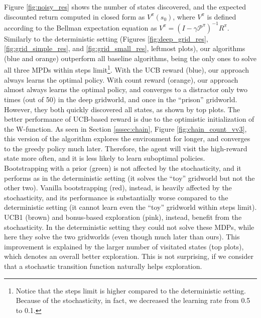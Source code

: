 \documentclass{article}
\newcommand{\reward}{R}
\providecommand{\prob}{\mathcal{P}}
\begin{document}
Figure \ref{fig:noisy_res} shows the number of states discovered, and the expected discounted return computed in closed form as $V^\pi(s_0)$, where $V^\pi$ is defined according to the Bellman expectation equation as $V^\pi = (I - \gamma \prob^\pi)^{-1}\reward^\pi$. Similarly to the deterministic setting (Figures \ref{fig:deep_grid_res}, \ref{fig:grid_simple_res}, and \ref{fig:grid_small_res}, leftmost plots), our algorithms (blue and orange) outperform all baseline algorithms, being the only ones to solve all three MPDs within steps limit\footnote{Notice that the steps limit is higher compared to the deterministic setting. Because of the stochasticity, in fact, we decreased the learning rate from 0.5 to 0.1.}. With the UCB reward (blue), our approach always learns the optimal policy. With count reward (orange), our approach almost always learns the optimal policy, and converges to a distractor only two times (out of 50) in the deep gridworld, and once in the ``prison'' gridworld. However, they both quickly discovered all states, as shown by top plots.
The better performance of UCB-based reward is due to the optimistic initialization of the W-function. As seen in Section \ref{sssec:chain}, Figure \ref{fig:chain_count_vv3}, this version of the algorithm explores the environment for longer, and converges to the greedy policy much later. Therefore, the agent will visit the high-reward state more often, and it is less likely to learn suboptimal policies.
\\Bootstrapping with a prior (green) is not affected by the stochasticity, and it performs as in the deterministic setting (it solves the ``toy'' gridworld but not the other two).
Vanilla bootstrapping (red), instead, is heavily affected by the stochasticity, and its performance is substantially worse compared to the deterministic setting (it cannot learn even the ``toy'' gridworld within steps limit). 
UCB1 (brown) and bonus-based exploration (pink), instead, benefit from the stochasticity. In the deterministic setting they could not solve these MDPs, while here they solve the two gridworlds (even though much later than ours). This improvement is explained by the larger number of visitated states (top plots), which denotes an overall better exploration. This is not surprising, if we consider that a stochastic transition function naturally helps exploration.



\clearpage
\end{document}
